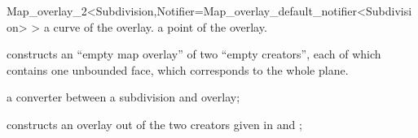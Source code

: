 \begin{ccRefClass}{Map_overlay_2<Subdivision,Notifier=Map_overlay_default_notifier<Subdivision> >}
  {a curve of the overlay.}
  \ccGlue
  {a point of the overlay.}


    
%     
%    
%    
%    
%    
    

\ccCreation
    
   {constructs an
     ``empty map overlay'' of two ``empty creators'', each of which 
     contains one unbounded face, which corresponds to the whole plane.}
  
  {a converter between a subdivision and overlay;}
  
  {constructs an overlay out of the two creators given in  and ;}
  
    

\end{ccRefClass}
